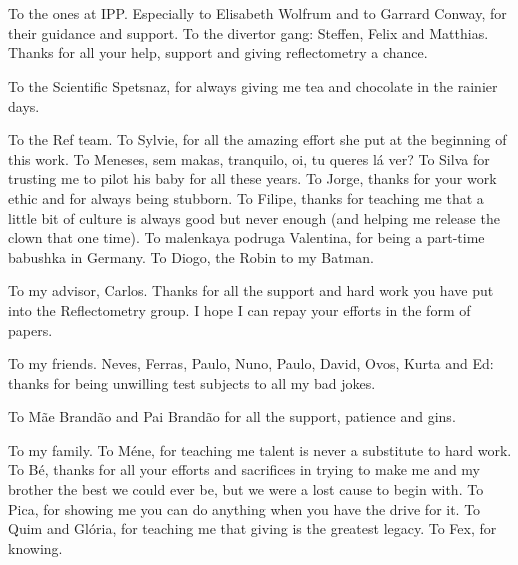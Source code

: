 
\section*{\acknowledgments}


To the ones at IPP. Especially to Elisabeth Wolfrum and to Garrard Conway, for their guidance and support. To the divertor gang: Steffen, Felix and Matthias. Thanks for all your help, support and giving reflectometry a chance.

To the Scientific Spetsnaz, for always giving me tea and chocolate in the rainier days.

To the Ref team. To Sylvie, for all the amazing effort she put at the beginning of this work. To Meneses, sem makas, tranquilo, oi, tu queres lá ver? To Silva for trusting me to pilot his baby for all these years. To Jorge, thanks for your work ethic and for always being stubborn. To Filipe, thanks for teaching me that a little bit of culture is always good but never enough (and helping me release the clown that one time). To malenkaya podruga Valentina, for being a part-time babushka in Germany. To Diogo, the Robin to my Batman.

To my advisor, Carlos. Thanks for all the support and hard work you have put into the Reflectometry group. I hope I can repay your efforts in the form of papers. 

To my friends. Neves, Ferras, Paulo, Nuno, Paulo, David, Ovos, Kurta and Ed: thanks for being unwilling test subjects to all my bad jokes.

To Mãe Brandão and Pai Brandão for all the support, patience and gins.

To my family. To Méne, for teaching me talent is never a substitute to hard work. To Bé, thanks for all your efforts and sacrifices in trying to make me and my brother the best we could ever be, but we were a lost cause to begin with. To Pica, for showing me you can do anything when you have the drive for it. To Quim and Glória, for teaching me that giving is the greatest legacy. To Fex, for knowing.

